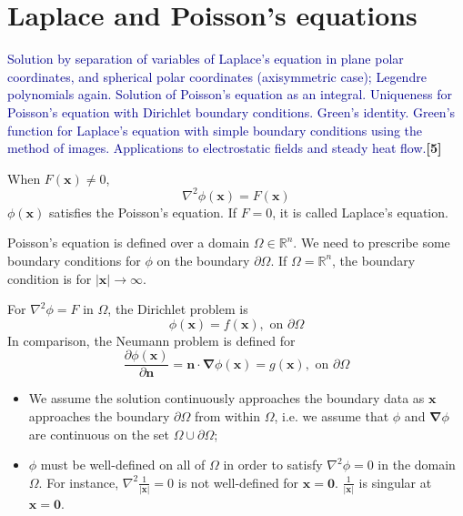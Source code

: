 \documentclass[a4paper]{article}
\begin{document}
\section{Laplace and Poisson's equations}
{\small\textcolor{darkblue}{Solution by separation of variables of Laplace's equation in plane polar coordinates, and spherical polar coordinates (axisymmetric case); Legendre polynomials again. Solution of Poisson's equation as an integral. Uniqueness for Poisson's equation with Dirichlet boundary conditions. Green's identity. Green's function for Laplace's equation with simple boundary conditions using the method of images. Applications to electrostatic fields and steady heat flow.}\hfill\textbf{[5]}}
\begin{defi}
When $F(\mathbf{x})\neq 0$,
\begin{equation}
\nabla^2\phi(\mathbf{x})=F(\mathbf{x})\tag{10.1}
\end{equation}
$\phi(\mathbf{x})$ satisfies the Poisson's equation. If $F=0$, it is called Laplace's equation.
\end{defi}
\begin{remarks}
Poisson's equation is defined over a domain $\Omega\in\mathbb{R}^n$. We need to prescribe some boundary conditions for $\phi$ on the boundary $\partial\Omega$. If $\Omega=\mathbb{R}^n$, the boundary condition is for $|\mathbf{x}|\rightarrow\infty$.
\end{remarks}
\begin{defi}
For $\nabla^2\phi=F$ in $\Omega$, the Dirichlet problem is 
$$\phi(\mathbf{x})=f(\mathbf{x}),\text{  on }\partial\Omega$$
In comparison, the Neumann problem is defined for
$$\frac{\partial\phi(\mathbf{x})}{\partial\mathbf{n}}=\mathbf{n}\cdot\boldsymbol{\nabla}\phi(\mathbf{x})=g(\mathbf{x}),\text{  on }\partial\Omega$$
\end{defi}
\begin{remarks}\leavevmode
\begin{itemize}
    \item We assume the solution continuously approaches the boundary data as $\mathbf{x}$ approaches the boundary $\partial\Omega$ from within $\Omega$, i.e. we assume that $\phi$ and $\boldsymbol{\nabla}\phi$ are continuous on the set $\Omega\cup\partial\Omega$;
    \item $\phi$ must be well-defined on all of $\Omega$ in order to satisfy $\nabla^2\phi=0$ in the domain $\Omega$. For instance, $\nabla^2\frac{1}{|\mathbf{x}|}=0$ is not well-defined for $\mathbf{x}=\boldsymbol{0}$. $\frac{1}{|\mathbf{x}|}$ is singular at $\mathbf{x}=\boldsymbol{0}$.
\end{itemize}
\end{remarks}
\end{document}
